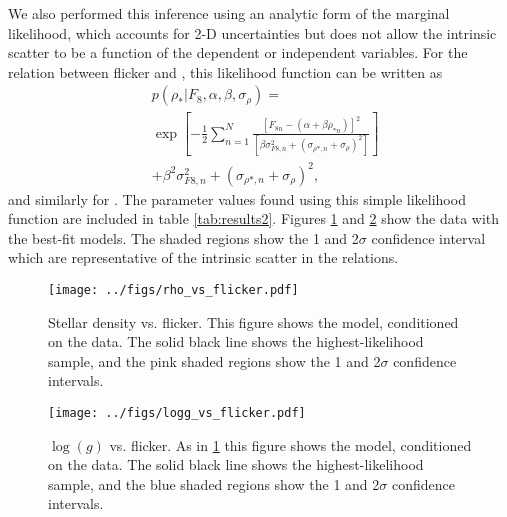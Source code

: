 We also performed this inference using an analytic form of the marginal
likelihood, which accounts for 2-D uncertainties but does not allow the
intrinsic scatter to be a function of the dependent or independent variables.
For the relation between flicker and \rhostar, this likelihood function can be
written as
\begin{eqnarray}
	& p(\rho_*| F_8, \alpha, \beta, \sigma_{\rho}) =  \\ \nonumber
						      & \exp \left[-\frac{1}{2}
		\sum_{n=1}^N \frac{[F_{8n}-(\alpha + \beta \rho_{*n})]^2}
	{\left[\beta \sigma_{F8, n}^2 + (\sigma_{\rho *, n}
	+ \sigma_{\rho})^2\right]}\right]
	\\ \nonumber
	& + \beta^2 \sigma_{F8, n}^2 + (\sigma_{\rho *, n} + \sigma_{\rho})^2,
\end{eqnarray}
\label{eq:likelihood}
and similarly for \logg.
The parameter values found using this simple likelihood function are included
in table \ref{tab:results2}.
Figures \ref{fig:rhostar} and \ref{fig:logg} show the data with the best-fit
models.
The shaded regions show the 1 and 2$\sigma$ confidence interval which are
representative of the intrinsic scatter in the relations.

\begin{figure}
\begin{center}
\texttt{[image: ../figs/rho\_vs\_flicker.pdf]}
\caption{
Stellar density vs. flicker.
This figure shows the model, conditioned on the data.
The solid black line shows the highest-likelihood sample, and the pink shaded
regions show the 1 and 2$\sigma$ confidence intervals.}
\label{fig:rhostar}
\end{center}
\end{figure}

\begin{figure}
\begin{center}
\texttt{[image: ../figs/logg\_vs\_flicker.pdf]}
\caption{
$\log(g)$ vs. flicker.
As in \ref{fig:rhostar} this figure shows the model, conditioned on the data.
The solid black line shows the highest-likelihood sample, and the blue shaded
regions show the 1 and 2$\sigma$ confidence intervals.}
\label{fig:logg}
\end{center}
\end{figure}

